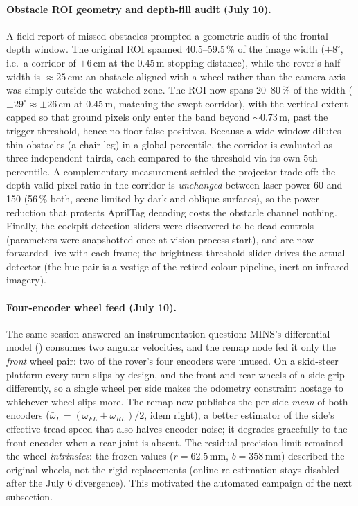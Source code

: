 \paragraph{Obstacle ROI geometry and depth-fill audit (July 10).} A field
report of missed obstacles prompted a geometric audit of the frontal depth
window. The original ROI spanned 40.5--59.5\,\% of the image width
($\pm 8^\circ$, i.e.\ a corridor of $\pm 6$\,cm at the 0.45\,m stopping
distance), while the rover's half-width is $\approx 25$\,cm: an obstacle
aligned with a wheel rather than the camera axis was simply outside the
watched zone. The ROI now spans 20--80\,\% of the width
($\pm 29^\circ \approx \pm 26$\,cm at 0.45\,m, matching the swept
corridor), with the vertical extent capped so that ground pixels only enter
the band beyond $\sim$0.73\,m, past the trigger threshold, hence no
floor false-positives. Because a wide window dilutes thin obstacles (a chair
leg) in a global percentile, the corridor is evaluated as three independent
thirds, each compared to the threshold via its own 5th percentile. A
complementary measurement settled the projector trade-off: the depth
valid-pixel ratio in the corridor is \emph{unchanged} between laser power 60
and 150 (56\,\% both, scene-limited by dark and oblique surfaces), so the
power reduction that protects AprilTag decoding costs the obstacle channel
nothing. Finally, the cockpit detection sliders were discovered to be dead
controls (parameters were snapshotted once at vision-process start), and
are now forwarded live with each frame; the brightness threshold slider
drives the actual detector (the hue pair is a vestige of the retired colour
pipeline, inert on infrared imagery).

\paragraph{Four-encoder wheel feed (July 10).} The same session answered an
instrumentation question: MINS's differential model ()
consumes two angular velocities, and the remap node fed it only the
\emph{front} wheel pair: two of the rover's four encoders were unused. On
a skid-steer platform every turn slips by design, and the front and rear
wheels of a side grip differently, so a single wheel per side makes the
odometry constraint hostage to whichever wheel slips more. The remap now
publishes the per-side \emph{mean} of both encoders
($\bar\omega_{L} = (\omega_{FL}+\omega_{RL})/2$, idem right), a better
estimator of the side's effective tread speed that also halves encoder noise;
it degrades gracefully to the front encoder when a rear joint is absent. The
residual precision limit remained the wheel \emph{intrinsics}: the frozen
values ($r = 62.5$\,mm, $b = 358$\,mm) described the original wheels, not
the rigid replacements (online re-estimation stays disabled after the July 6
divergence). This motivated the automated campaign of the next subsection.

